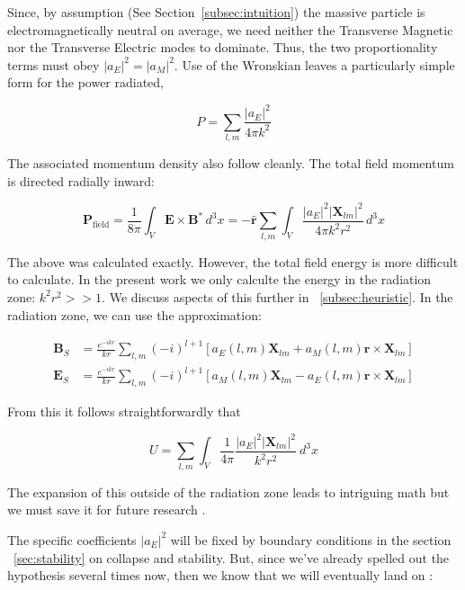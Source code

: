 \documentclass {article}
\renewcommand\vec{\mathbf}
\let\OldHat\hat
\renewcommand{\hat}[1]{\OldHat{\mathbf{#1}}}
\begin{document}
Since, by assumption (See Section~\ref{subsec:intuition}) the massive particle is electromagnetically neutral on average, we need neither the Transverse Magnetic nor the Transverse Electric modes to dominate. Thus, the two proportionality terms must obey $|a_E|^2 = |a_M|^2$. Use of the Wronskian leaves a particularly simple form for the power radiated,


\begin{equation}
P = \sum_{l,m} \frac {|a_E|^2} { 4 \pi k^2}
\end{equation}

The associated momentum density also follow cleanly. The total field momentum is directed radially inward:

\begin{equation}
\vec{P}_{\text{field}} = \frac{1}{8\pi} \int_V \vec{E} \times \vec{B}^* \, d^3x
= -\hat{r} \sum_{l,m} \int_V \frac{|a_E|^2 |\vec{X}_{lm}|^2}{4\pi k^2 r^2} \, d^3x
\label{eq:mom}
\end{equation}


The above was calculated exactly. However, the total field energy is more difficult to calculate. In the present work we only calculte the energy in the radiation zone: $k^2 r^2  >> 1$. We discuss aspects of this further in ~\ref{subsec:heuristic}. In the radiation zone, we can use the approximation:


\begin{equation}
\begin{aligned}
\vec{B}_S &= \frac {e^{-ikr}} {kr}  \sum_{l,m}  (-i)^{l+1}    \left[
a_E(l,m) \vec{X}_{lm}
+ a_M(l,m) \hat{r} \times  \vec{X}_{lm} 
\right] \\
\vec{E}_S &= \frac {e^{-ikr}} {kr} \sum_{l,m}  (-i)^{l+1}   \left[
a_M(l,m) \vec{X}_{lm}
- a_E(l,m) \hat{r} \times  \vec{X}_{lm} 
\right] 
\end{aligned}
\end{equation}

From this it follows straightforwardly that 


\begin{equation}
U  =\sum_{l, m}   \int_V \frac 1 {4 \pi}  \frac {|a_E|^2 |\vec X_{lm} |^2}{k^2 r^2} ~ d^3x 
\label{eq:energy}
\end{equation}

The expansion of this outside of the radiation zone leads to intriguing math but we must save it for future research .

The specific coefficients \( |a_E|^2 \) will be fixed by boundary conditions in the section ~\ref{sec:stability} on collapse and stability. But, since we've already spelled out the hypothesis several times now, then we know that we will eventually land on
:
\end{document}
